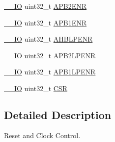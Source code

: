 \begin{DoxyCompactItemize}
\item 
\hyperlink{core__sc300_8h_aec43007d9998a0a0e01faede4133d6be}{\-\_\-\-\_\-\-I\-O} uint32\-\_\-t \hyperlink{struct_r_c_c___type_def_a619b4c22f630a269dfd0c331f90f6868}{A\-P\-B2\-E\-N\-R}
\item 
\hyperlink{core__sc300_8h_aec43007d9998a0a0e01faede4133d6be}{\-\_\-\-\_\-\-I\-O} uint32\-\_\-t \hyperlink{struct_r_c_c___type_def_aec7622ba90341c9faf843d9ee54a759f}{A\-P\-B1\-E\-N\-R}
\item 
\hyperlink{core__sc300_8h_aec43007d9998a0a0e01faede4133d6be}{\-\_\-\-\_\-\-I\-O} uint32\-\_\-t \hyperlink{struct_r_c_c___type_def_a5a89bd730b7710a0e24d068cb6e4c90f}{A\-H\-B\-L\-P\-E\-N\-R}
\item 
\hyperlink{core__sc300_8h_aec43007d9998a0a0e01faede4133d6be}{\-\_\-\-\_\-\-I\-O} uint32\-\_\-t \hyperlink{struct_r_c_c___type_def_a7e46c65220f00a6858a5b35b74a37b51}{A\-P\-B2\-L\-P\-E\-N\-R}
\item 
\hyperlink{core__sc300_8h_aec43007d9998a0a0e01faede4133d6be}{\-\_\-\-\_\-\-I\-O} uint32\-\_\-t \hyperlink{struct_r_c_c___type_def_a5c8e710c40b642dcbf296201a7ecb2da}{A\-P\-B1\-L\-P\-E\-N\-R}
\item 
\hyperlink{core__sc300_8h_aec43007d9998a0a0e01faede4133d6be}{\-\_\-\-\_\-\-I\-O} uint32\-\_\-t \hyperlink{struct_r_c_c___type_def_a7e913b8bf59d4351e1f3d19387bd05b9}{C\-S\-R}
\end{DoxyCompactItemize}


\subsection{Detailed Description}
Reset and Clock Control. 

